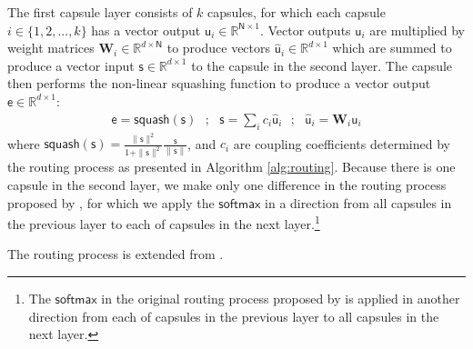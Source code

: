 \documentclass[11pt,a4paper]{article}
\begin{document}
The first capsule layer consists of $k$ capsules, for which each capsule $i \in \{1, 2, ..., k\}$ has a vector output $\boldsymbol{\mathsf{u}}_{i} \in \mathbb{R}^{\mathsf{N}\times1}$.
Vector outputs $\boldsymbol{\mathsf{u}}_{i}$ are multiplied by weight matrices $\textbf{W}_{i} \in \mathbb{R}^{d\times\mathsf{N}}$ to produce vectors $\hat{\boldsymbol{\mathsf{u}}}_{i} \in \mathbb{R}^{d\times1}$ which are summed to produce a vector input $\boldsymbol{\mathsf{s}} \in \mathbb{R}^{d\times1}$ to the capsule in the second layer.
The capsule then performs the non-linear squashing function to produce a vector output $\boldsymbol{\mathsf{e}} \in \mathbb{R}^{d\times1}$:
\begin{eqnarray}
\boldsymbol{\mathsf{e}} = \mathsf{squash}\left(\boldsymbol{\mathsf{s}}\right) \ \ \ ;  \ \ \ \boldsymbol{\mathsf{s}} = \sum_{i} c_{i}\hat{\boldsymbol{\mathsf{u}}}_{i} \ \ \ ;  \ \ \ \hat{\boldsymbol{\mathsf{u}}}_{i} = \textbf{W}_{i} \boldsymbol{\mathsf{u}}_{i} \nonumber
\end{eqnarray}
where $\mathsf{squash}\left(\boldsymbol{\mathsf{s}}\right) = \frac{\|\boldsymbol{\mathsf{s}}\|^2}{1 + \|\boldsymbol{\mathsf{s}}\|^2}\frac{\boldsymbol{\mathsf{s}}}{\|\boldsymbol{\mathsf{s}}\|}$, and $c_{i}$ are coupling coefficients determined by the routing process as presented in Algorithm \ref{alg:routing}. 
Because there is one capsule in the second layer, we make only one difference in the routing process proposed by \citet{sabour2017dynamic}, for which we apply the $\mathsf{softmax}$ in a direction from all capsules in the previous layer to each of capsules in the next layer.\footnote{The $\mathsf{softmax}$ in the original routing process proposed by \citet{sabour2017dynamic} is applied in another direction from each of capsules in the previous layer to all capsules in the next layer.}


\begin{algorithm}[ht]
\DontPrintSemicolon
\SetAlgoVlined
{}

\caption{The routing process is extended from \citet{sabour2017dynamic}.}
\label{alg:routing}
\end{algorithm}
\end{document}
